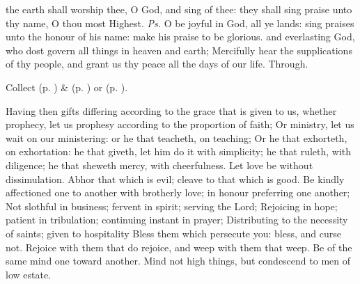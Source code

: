 \introit
{} the earth shall worship thee, O God, and sing of thee: they shall sing praise unto thy name, O thou most Highest. \textit{Ps.} O be joyful in God, all ye lands: sing praises unto the honour of his name: make his praise to be glorious.
\collect\label{EpiphanyIICollect}
 and everlasting God, who dost govern all things in heaven and earth; Mercifully hear the supplications of thy people, and grant us thy peace all the days of our life. Through.
\begin{rubric}
     Collect  (p. \pageref{SPMaryPostChristmas}) \&   (p. \pageref{SPAgainst}) or  (p. \pageref{SPChiefBishop}).
\end{rubric}
 Having then gifts differing according to the grace that is given to us, whether prophecy, let us prophesy according to the proportion of faith; Or ministry, let us wait on our ministering: or he that teacheth, on teaching; Or he that exhorteth, on exhortation: he that giveth, let him do it with simplicity; he that ruleth, with diligence; he that sheweth mercy, with cheerfulness. Let love be without dissimulation. Abhor that which is evil; cleave to that which is good. Be kindly affectioned one to another with brotherly love; in honour preferring one another; Not slothful in business; fervent in spirit; serving the Lord; Rejoicing in hope; patient in tribulation; continuing instant in prayer; Distributing to the necessity of saints; given to hospitality Bless them which persecute you: bless, and curse not. Rejoice with them that do rejoice, and weep with them that weep. Be of the same mind one toward another. Mind not high things, but condescend to men of low estate.

